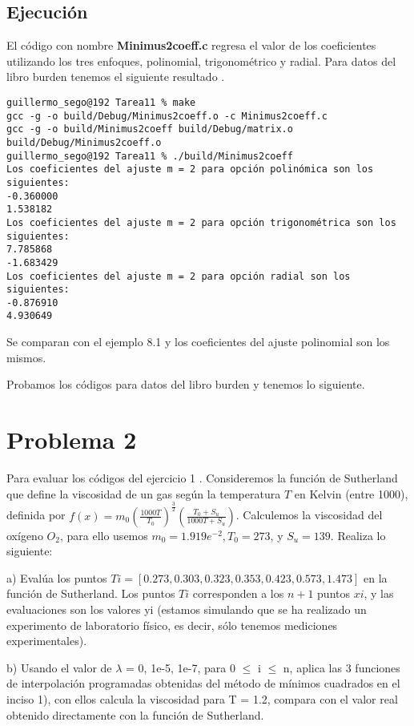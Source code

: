 \documentclass{article}
\begin{document}
\subsection{Ejecución}

El código con nombre \textbf{Minimus2coeff.c} regresa el valor de los coeficientes utilizando los tres enfoques, polinomial, trigonométrico y radial. Para datos del libro burden tenemos el siguiente resultado \cite{burden2015numerical}.

\begin{lstlisting}
guillermo_sego@192 Tarea11 % make
gcc -g -o build/Debug/Minimus2coeff.o -c Minimus2coeff.c
gcc -g -o build/Minimus2coeff build/Debug/matrix.o build/Debug/Minimus2coeff.o
guillermo_sego@192 Tarea11 % ./build/Minimus2coeff
Los coeficientes del ajuste m = 2 para opción polinómica son los siguientes:
-0.360000 
1.538182 
Los coeficientes del ajuste m = 2 para opción trigonométrica son los siguientes:
7.785868 
-1.683429 
Los coeficientes del ajuste m = 2 para opción radial son los siguientes:
-0.876910 
4.930649 
\end{lstlisting}

Se comparan con el ejemplo 8.1 y los coeficientes del ajuste polinomial son los mismos. 

Probamos los códigos para datos del libro burden y tenemos lo siguiente.

\section{Problema 2}
Para evaluar los códigos del ejercicio 1 . Consideremos la función de Sutherland que define la viscosidad de un gas según la temperatura $T$ en Kelvin (entre 1000), definida por $f(x)=m_0\left(\frac{1000 T}{T_0}\right)^{\frac{3}{2}}\left(\frac{T_0+S_u}{1000 T+S_u}\right)$. Calculemos la viscosidad del oxígeno $O_2$, para ello usemos $m_0=1.919 e^{-2}, T_0=273$, y $S_u=139$. Realiza lo siguiente:

a) Evalúa los puntos $T i=[0.273,0.303,0.323,0.353,0.423,0.573,1.473]$ en la función de Sutherland. Los puntos $T i$ corresponden a los $n+1$ puntos $x i$, y las evaluaciones son los valores yi (estamos simulando que se ha realizado un experimento de laboratorio físico, es decir, sólo tenemos mediciones experimentales).

b) Usando el valor de $\lambda$ = 0, 1e-5, 1e-7, para 0 $\leq$ i $\leq$ n, aplica las 3 funciones de interpolación programadas obtenidas del método de mínimos cuadrados en el inciso 1), con ellos calcula la viscosidad para T = 1.2, compara con el valor real obtenido directamente con la función de Sutherland.
\end{document}
